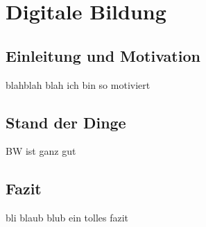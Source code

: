 \chapter{Digitale Bildung}

\section{Einleitung und Motivation}

blahblah blah ich bin so motiviert

\section{Stand der Dinge}

BW ist ganz gut

\section{Fazit}
bli blaub blub ein tolles fazit